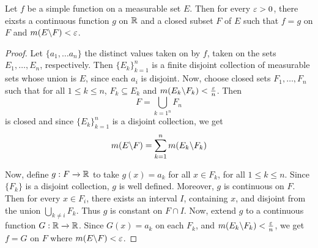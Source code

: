 \begin{theorem}\label{9.3.3}
    Let $f$ be a simple function on a measurable set $E$. Then for every
    $\varepsilon>0$, there eixsts a continuous function  $g$ on  $\mathbb{R}$ and a closed subset
    $F$ of $E$ such that $f=g$ on  $F$ and  $m(E \backslash F)<\varepsilon$.
\end{theorem}
\begin{proof}
    Let $\{a_1, \dots a_n\}$ the distinct values taken on by $f$, taken on the
    sets $E_1, \dots, E_n$, respectively. Then $\{E_k\}_{k=1}^n$ is a finite
    disjoint collection of measurable sets whose union is $E$, since each $a_i$
    is disjoint. Now, choose closed sets $F_1, \dots, F_n$ such that for all $1
    \leq k \leq n$, $F_k \subseteq E_k$ and $m(E_k \backslash F_k)<\frac{\varepsilon}{n}$.
    Then
    \begin{equation*}
        F=\bigcup_{k=1^n}{F_n}
    \end{equation*}
    is closed and since $\{E_k\}_{k=1}^n$ is a disjoint collection, we get
    \begin{equation*}
        m(E \backslash F)=\sum_{k=1}^n{m(E_k \backslash F_k)}
    \end{equation*}

    Now, define $g:F \xrightarrow{} \mathbb{R}$ to take $g(x)=a_k$ for all $x \in F_k$,
    for all  $1 \leq k \leq n$. Since $\{F_k\}$ is a disjoint collection, $g$ is
    well defined. Moreover,  $g$ is continuous on $F$. Then for every  $x \in
    F_i$, there exists an interval  $I$, containing  $x$, and disjoint from the
    union $\bigcup_{k \neq i}{F_k}$. Thus $g$ is constant on  $F \cap I$. Now,
    extend  $g$ to a continuous function  $G:\mathbb{R} \xrightarrow{} \mathbb{R}$. Since
    $G(x)=a_k$ on each $F_k$, and  $m(E_k \backslash F_k)<\frac{\varepsilon}{n}$, we get
    $f=G$ on $F$ where $m(E \backslash F)<\varepsilon$.
\end{proof}

